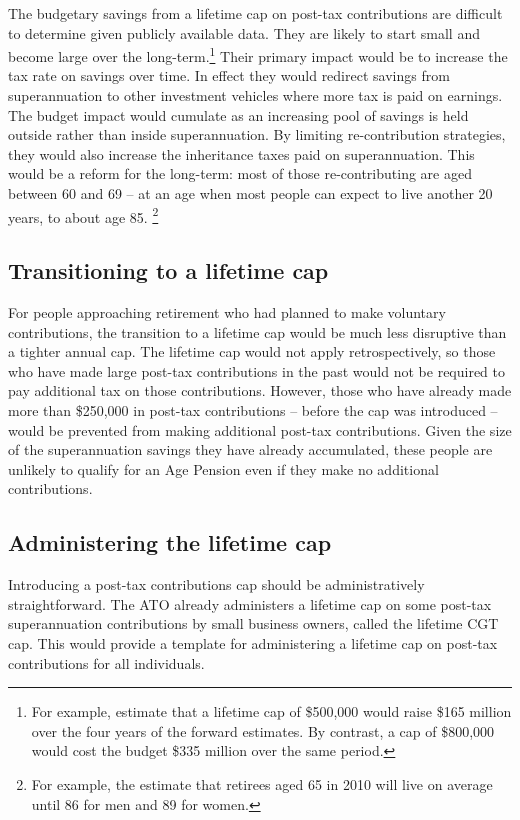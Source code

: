 The budgetary savings from a lifetime cap on post-tax contributions are difficult to determine given publicly available data. They are likely to start small and become large over the long-term.\footnote{For example, \textcite{PBO2015-Super-for-retirement-not-tax-minimisation} estimate that a lifetime cap of \$500,000 would raise \$165 million over the four years of the forward estimates. By contrast, a cap of \$800,000 would cost the budget \$335 million over the same period.}  Their primary impact would be to increase the tax rate on savings over time. In effect they would redirect savings from superannuation to other investment vehicles where more tax is paid on earnings. The budget impact would cumulate as an increasing pool of savings is held outside rather than inside superannuation. By limiting re-contribution strategies, they would also increase the inheritance taxes paid on superannuation. This would be a reform for the long-term: most of those re-contributing are aged between 60 and 69 – at an age when most people can expect to live another 20 years, to about age 85.%
\footnote{For example, the \textcite[][6]{ActuariesInstitute2012-Australias-Longevity-Tsunami}  estimate that retirees aged 65 in 2010 will live on average until 86 for men and 89 for women.}  

\subsection{Transitioning to a lifetime cap}
For people approaching retirement who had planned to make voluntary contributions, the transition to a lifetime cap would be much less disruptive than a tighter annual cap. The lifetime cap would not apply retrospectively, so those who have made large post-tax contributions in the past would not be required to pay additional tax on those contributions. However, those who have already made more than \$250,000 in post-tax contributions – before the cap was introduced – would be prevented from making additional post-tax contributions. Given the size of the superannuation savings they have already accumulated, these people are unlikely to qualify for an Age Pension even if they make no additional contributions.

\subsection{Administering the lifetime cap}
Introducing a post-tax contributions cap should be administratively straightforward. The ATO already administers a lifetime cap on some post-tax superannuation contributions by small business owners, called the lifetime CGT cap. This would provide a template for administering a lifetime cap on post-tax contributions for all individuals.

